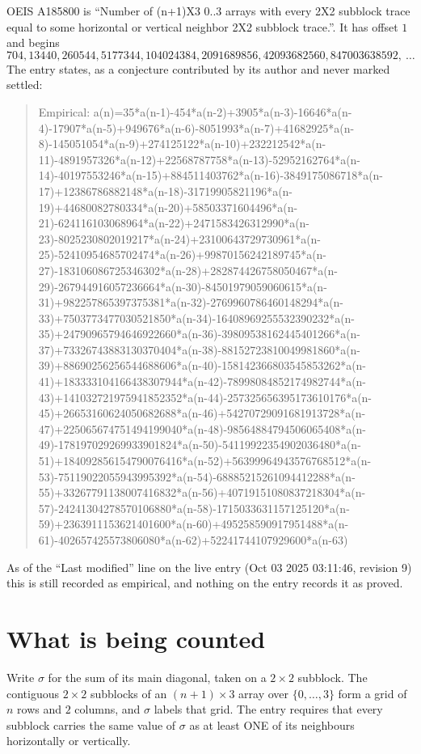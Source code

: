 \documentclass[11pt,a4paper]{article}
\theoremstyle{plain}
\theoremstyle{definition}
\begin{document}
OEIS A185800 is ``Number of (n+1)X3 0..3 arrays with every 2X2 subblock trace equal to some horizontal or vertical neighbor 2X2 subblock trace.''. It has offset $1$ and begins
\[
704, 13440, 260544, 5177344, 104024384, 2091689856, 42093682560, 847003638592,\ \dots
\]
The entry states, as a conjecture contributed by its author and never marked settled:
\begin{quote}
Empirical: a(n)=35*a(n-1)-454*a(n-2)+3905*a(n-3)-16646*a(n-4)-17907*a(n-5)+949676*a(n-6)-8051993*a(n-7)+41682925*a(n-8)-145051054*a(n-9)+274125122*a(n-10)+232212542*a(n-11)-4891957326*a(n-12)+22568787758*a(n-13)-52952162764*a(n-14)-40197553246*a(n-15)+884511403762*a(n-16)-3849175086718*a(n-17)+12386786882148*a(n-18)-31719905821196*a(n-19)+44680082780334*a(n-20)+58503371604496*a(n-21)-624116103068964*a(n-22)+2471583426312990*a(n-23)-8025230802019217*a(n-24)+23100643729730961*a(n-25)-52410954685702474*a(n-26)+99870156242189745*a(n-27)-183106086725346302*a(n-28)+282874426758050467*a(n-29)-267944916057236664*a(n-30)-84501979059060615*a(n-31)+982257865397375381*a(n-32)-2769960786460148294*a(n-33)+7503773477030521850*a(n-34)-16408969255532390232*a(n-35)+24790965794646922660*a(n-36)-39809538162445401266*a(n-37)+73326743883130370404*a(n-38)-88152723810049981860*a(n-39)+88690256256544688606*a(n-40)-158142366803545853262*a(n-41)+183333104166438307944*a(n-42)-78998084852174982744*a(n-43)+141032721975941852352*a(n-44)-257325656395173610176*a(n-45)+26653160624050682688*a(n-46)+54270729091681913728*a(n-47)+225065674751494199040*a(n-48)-98564884794506065408*a(n-49)-178197029269933901824*a(n-50)-54119922354902036480*a(n-51)+184092856154790076416*a(n-52)+56399964943576768512*a(n-53)-75119022055943995392*a(n-54)-68885215261094412288*a(n-55)+33267791138007416832*a(n-56)+40719151080837218304*a(n-57)-24241304278570106880*a(n-58)-1715033631157125120*a(n-59)+2363911153621401600*a(n-60)+495258590917951488*a(n-61)-402657425573806080*a(n-62)+52241744107929600*a(n-63)
\end{quote}
As of the ``Last modified'' line on the live entry (Oct 03 2025 03:11:46, revision 9) this is still
recorded as empirical, and nothing on the entry records it as proved.

\section{What is being counted}

Write $\sigma$ for the sum of its main diagonal, taken on a $2\times2$ subblock. The contiguous $2\times2$
subblocks of an $(n+1)\times3$ array over $\{0,\dots,3\}$ form a grid of $n$ rows
and $2$ columns, and $\sigma$ labels that grid. The entry
requires that every subblock carries the same value of $\sigma$ as at least ONE of its neighbours horizontally or vertically.
\end{document}
